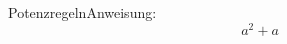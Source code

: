 \documentclass[preview]{standalone}
\begin{document}
\begin{mytheo*}{Potenzregeln}{Anweisung: $$a^2+a$$}

\end{mytheo*}
\end{document}
